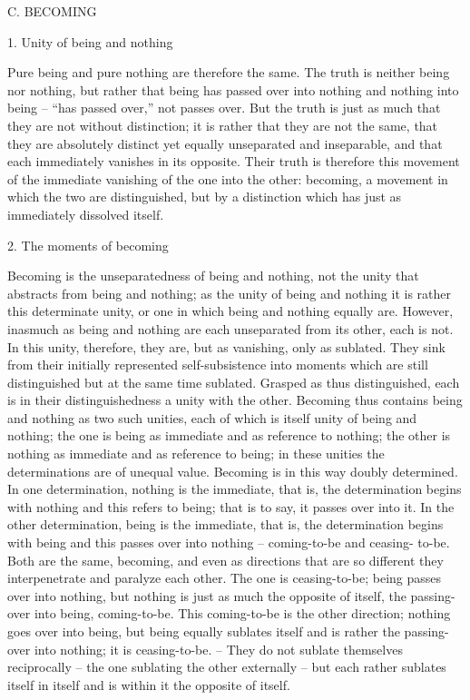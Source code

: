 C. BECOMING

1. Unity of being and nothing

Pure being and pure nothing are therefore the same. The truth is neither
being nor nothing, but rather that being has passed over into nothing and
nothing into being – “has passed over,” not passes over. But the truth is
just as much that they are not without distinction; it is rather that they are
not the same, that they are absolutely distinct yet equally unseparated and
inseparable, and that each immediately vanishes in its opposite. Their truth
is therefore this movement of the immediate vanishing of the one into the
other: becoming, a movement in which the two are distinguished, but by a
distinction which has just as immediately dissolved itself.

2. The moments of becoming

Becoming is the unseparatedness of being and nothing, not the unity that
abstracts from being and nothing; as the unity of being and nothing it is
rather this determinate unity, or one in which being and nothing equally
are. However, inasmuch as being and nothing are each unseparated from
its other, each is not. In this unity, therefore, they are, but as vanishing, only
as sublated. They sink from their initially represented self-subsistence into
moments which are still distinguished but at the same time sublated.
Grasped as thus distinguished, each is in their distinguishedness a unity
with the other. Becoming thus contains being and nothing as two such
unities, each of which is itself unity of being and nothing; the one is being
as immediate and as reference to nothing; the other is nothing as immediate
and as reference to being; in these unities the determinations are of unequal
value.
Becoming is in this way doubly determined. In one determination,
nothing is the immediate, that is, the determination begins with nothing
and this refers to being; that is to say, it passes over into it. In the other
determination, being is the immediate, that is, the determination begins
with being and this passes over into nothing – coming-to-be and ceasing-
to-be.
Both are the same, becoming, and even as directions that are so different
they interpenetrate and paralyze each other. The one is ceasing-to-be; being
passes over into nothing, but nothing is just as much the opposite of
itself, the passing-over into being, coming-to-be. This coming-to-be is the
other direction; nothing goes over into being, but being equally sublates
itself and is rather the passing-over into nothing; it is ceasing-to-be. –
They do not sublate themselves reciprocally – the one sublating the other
externally – but each rather sublates itself in itself and is within it the
opposite of itself.

